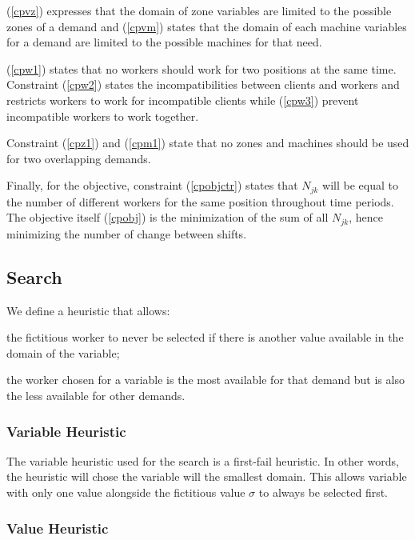 \documentclass[../../thesis.tex]{subfiles}
\begin{document}
(\ref{cpvz}) expresses that the domain of zone variables are limited to the possible zones of a demand and (\ref{cpvm}) states that 
the domain of each machine variables for a demand are limited to the possible machines for that need.

(\ref{cpw1}) states that no workers should work for two positions at the same time. Constraint (\ref{cpw2}) states
the incompatibilities between clients and workers and restricts workers to work for incompatible clients while 
(\ref{cpw3}) prevent incompatible workers to work together.

Constraint (\ref{cpz1}) and (\ref{cpm1}) state that no zones and machines should be used for two overlapping demands.

Finally, for the objective, constraint (\ref{cpobjctr}) states that $N_{jk}$ will be equal to the number of different workers for the same position 
throughout time periods. The objective itself (\ref{cpobj}) is the minimization of the sum of all $N_{jk}$, hence minimizing the number of change between 
shifts.


\subsection{Search}

We define a heuristic that allows:
\begin{enumerate*}[label=(\roman*)]
  \item the fictitious worker to never be selected if there is another value available in the domain of the variable;
  \item the worker chosen for a variable is the most available for that demand but is also the less available for other demands.
\end{enumerate*}

\subsubsection{Variable Heuristic}

The variable heuristic used for the search is a first-fail heuristic. In other words, the heuristic 
will chose the variable will the smallest domain. This allows variable with only one value alongside the 
fictitious value $\sigma$ to always be selected first.

\subsubsection{Value Heuristic}
\end{document}
